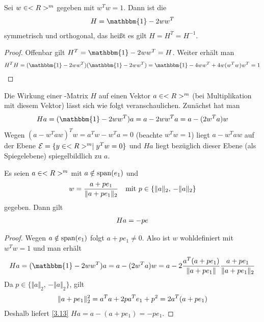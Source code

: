 \begin{proposition}
	Sei $w\in<R>^m$ gegeben mit $w^Tw=1$. Dann ist die 
	\begin{align}
		H = \mathbbm{1} - 2ww^T\notag
	\end{align}
	symmetrisch und orthogonal, das heißt es gilt $H=H^T=H^{-1}$.
\end{proposition}
\begin{proof}
	Offenbar gilt $H^T=\mathbbm{1}-2ww^T=H$. Weiter erhält man
	\begin{align}
		H^TH=(\mathbbm{1}-2ww^T)(\mathbbm{1}-2ww^T) = \mathbbm{1} - 4ww^T + 4w(w^Tw)w^T = 1\notag
	\end{align}
\end{proof}

Die Wirkung einer -Matrix $H$ auf einen Vektor $a\in<R>^m$ (bei Multiplikation mit diesem Vektor) lässt sich wie folgt veranschaulichen. Zunächst hat man
\begin{align}
	Ha=(\mathbbm{1}-2ww^T)a = a-2ww^Ta = a-(2w^Ta)w\notag
\end{align}
Wegen $(a-w^Taw)^Tw=a^Tw-w^Ta=0$ (beachte $w^Tw=1$) liegt $a-w^Taw$ auf der Ebene $\mathcal{E}=\{y\in<R>^m\mid y^Tw=0\}$ und $Ha$ liegt bezüglich dieser Ebene (als Spiegelebene) spiegelbildlich zu $a$.

\begin{proposition}
	Es seien $a\in<R>^m$ mit $a\notin\operatorname{span}(e_1)$ und 
	\begin{align}
		w = \frac{a+pe_1}{\Vert a+pe_1\Vert_2}\quad\text{mit } p\in\{\Vert a\Vert_2,\, -\Vert a\Vert_2\}\notag
	\end{align}
	gegeben. Dann gilt
	\begin{align}
		Ha = -pe\notag
	\end{align}
\end{proposition}
\begin{proof}
	Wegen $a\notin\operatorname{span}(e_1)$ folgt $a+pe_1\neq 0$. Also ist $w$ wohldefiniert mit $w^Tw=1$ und man erhält
	\begin{align}
		\label{3.13}
		Ha = (\mathbbm{1}-2ww^T)a = a-(2w^Ta)w = a-2\frac{a^T(a+pe_1)}{\Vert a+pe_1\Vert}\frac{a+pe_1}{\Vert a+pe_1\Vert_2}
	\end{align}
	Da $p\in\{\Vert a\Vert_2,\, -\Vert a\Vert_2\}$, gilt
	\begin{align}
		\Vert a+pe_1\Vert_2^2 = a^Ta+2pa^Te_1+p^2 = 2a^T(a+pe_1)\notag
	\end{align}
	Deshalb liefert \cref{3.13} $Ha = a-(a+pe_1) = -pe_1$.
\end{proof}

